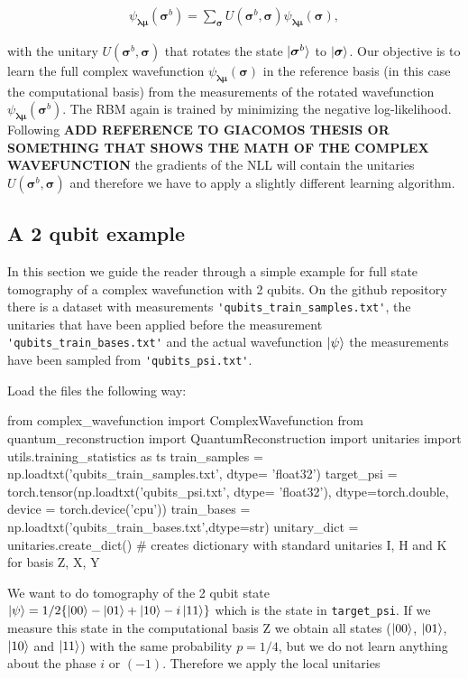 \documentclass[submission, Phys]{SciPost}
\begin{document}
\begin{align}
\psi_{\bm{\lambda} \bm{\mu}} (\bm{\sigma}^b)= \sum_{\bm{\sigma}} U (\bm{\sigma}^b, \bm{\sigma}) \psi_{\bm{\lambda} \bm{\mu}} (\bm{\sigma}),
\end{align}

with the unitary $U (\bm{\sigma}^b, \bm{\sigma})$ that rotates the state $\ket{\bm{\sigma}^b}$ to $\ket{\bm{\sigma}}$. Our objective is to learn the full complex wavefunction $\psi_{\bm{\lambda} \bm{\mu}} (\bm{\sigma})$ in the reference basis (in this case the computational basis) from the measurements of the rotated wavefunction $\psi_{\bm{\lambda} \bm{\mu}} (\bm{\sigma}^b)$.
The RBM again is trained by minimizing the negative log-likelihood. Following \cite{} \textbf{ADD REFERENCE TO GIACOMOS THESIS OR SOMETHING THAT SHOWS THE MATH OF THE COMPLEX WAVEFUNCTION} the gradients of the NLL will contain the unitaries $U (\bm{\sigma}^b, \bm{\sigma})$ and therefore we have to apply a slightly different learning algorithm.

\subsection{A 2 qubit example}

In this section we guide the reader through a simple example for full state tomography of a complex wavefunction with 2 qubits. On the github repository there is a dataset with measurements \verb|'qubits_train_samples.txt'|, the unitaries that have been applied before the measurement \verb|'qubits_train_bases.txt'| and the actual wavefunction $\ket{\psi}$ the measurements have been sampled from \verb|'qubits_psi.txt'|.

Load the files the following way:

\begin{python}
from complex_wavefunction import ComplexWavefunction
from quantum_reconstruction import QuantumReconstruction
import unitaries
import utils.training_statistics as ts
train_samples = np.loadtxt('qubits_train_samples.txt', dtype= 'float32')
target_psi  = torch.tensor(np.loadtxt('qubits_psi.txt', dtype= 'float32'), dtype=torch.double, device = torch.device('cpu'))
train_bases = np.loadtxt('qubits_train_bases.txt',dtype=str)
unitary_dict = unitaries.create_dict() # creates dictionary with standard unitaries I, H and K for basis Z, X, Y
\end{python}


We want to do tomography of the 2 qubit state $\ket{\psi} = 1/2 \{ \ket{00} - \ket{01} + \ket{10} - i \ket{11} \}$ which is the state in \verb|target_psi|. If we measure this state in the computational basis Z we obtain all states ($\ket{00}$, $\ket{01}$, $\ket{10}$ and $\ket{11}$) with the same probability $p = 1/4$, but we do not learn anything about the phase $i$ or $(-1)$. Therefore we apply the local unitaries
\end{document}
